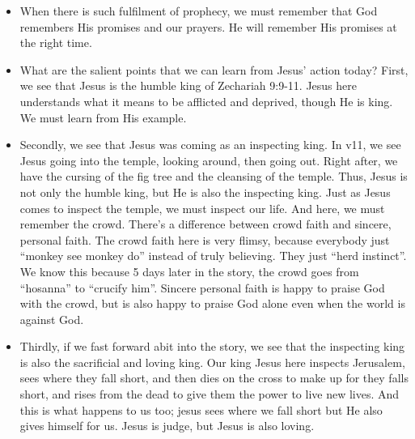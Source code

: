 \begin{itemize}
  \item{When there is such fulfilment of prophecy, we must remember that God remembers His promises and our prayers. He will remember His promises at the right time. }
  \item{What are the salient points that we can learn from Jesus’ action today? First, we see that Jesus is the humble king of Zechariah 9:9-11. Jesus here understands what it means to be afflicted and deprived, though He is king. We must learn from His example. }
  \item{Secondly, we see that Jesus was coming as an inspecting king. In v11, we see Jesus going into the temple, looking around, then going out. Right after, we have the cursing of the fig tree and the cleansing of the temple. Thus, Jesus is not only the humble king, but He is also the inspecting king. Just as Jesus comes to inspect the temple, we must inspect our life. And here, we must remember the crowd. There’s a difference between crowd faith and sincere, personal faith. The crowd faith here is very flimsy, because everybody just “monkey see monkey do” instead of truly believing. They just “herd instinct”. We know this because 5 days later in the story, the crowd goes from “hosanna” to “crucify him”. Sincere personal faith is happy to praise God with the crowd, but is also happy to praise God alone even when the world is against God.}
  \item{Thirdly, if we fast forward abit into the story, we see that the inspecting king is also the sacrificial and loving king. Our king Jesus here inspects Jerusalem, sees where they fall short, and then dies on the cross to make up for they falls short, and rises from the dead to give them the power to live new lives. And this is what happens to us too; jesus sees where we fall short but He also gives himself for us. Jesus is judge, but Jesus is also loving.}
\end{itemize}